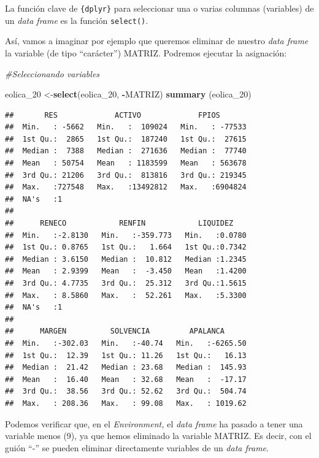 \documentclass[
]{book}
\newenvironment{Shaded}{\begin{snugshade}}{\end{snugshade}}
\newcommand{\CommentTok}[1]{\textcolor[rgb]{0.56,0.35,0.01}{\textit{#1}}}
\newcommand{\FunctionTok}[1]{\textcolor[rgb]{0.13,0.29,0.53}{\textbf{#1}}}
\newcommand{\NormalTok}[1]{#1}
\newcommand{\OtherTok}[1]{\textcolor[rgb]{0.56,0.35,0.01}{#1}}
\newcommand{\SpecialCharTok}[1]{\textcolor[rgb]{0.81,0.36,0.00}{\textbf{#1}}}
\begin{document}
La función clave de \texttt{\{dplyr\}} para seleccionar una o varias columnas (variables) de un \emph{data frame} es la función \texttt{select()}.

Así, vamos a imaginar por ejemplo que queremos eliminar de nuestro \emph{data frame} la variable (de tipo ``carácter'') MATRIZ. Podremos ejecutar la asignación:

\begin{Shaded}
\begin{Highlighting}[]
\CommentTok{\#Seleccionando variables}

\NormalTok{eolica\_20 }\OtherTok{\textless{}{-}}\FunctionTok{select}\NormalTok{(eolica\_20, }\SpecialCharTok{{-}}\NormalTok{MATRIZ)}
\FunctionTok{summary}\NormalTok{ (eolica\_20)}
\end{Highlighting}
\end{Shaded}

\begin{verbatim}
##       RES             ACTIVO             FPIOS        
##  Min.   : -5662   Min.   :  109024   Min.   : -77533  
##  1st Qu.:  2865   1st Qu.:  187240   1st Qu.:  27615  
##  Median :  7388   Median :  271636   Median :  77740  
##  Mean   : 50754   Mean   : 1183599   Mean   : 563678  
##  3rd Qu.: 21206   3rd Qu.:  813816   3rd Qu.: 219345  
##  Max.   :727548   Max.   :13492812   Max.   :6904824  
##  NA's   :1                                            
## 
##      RENECO            RENFIN            LIQUIDEZ     
##  Min.   :-2.8130   Min.   :-359.773   Min.   :0.0780  
##  1st Qu.: 0.8765   1st Qu.:   1.664   1st Qu.:0.7342  
##  Median : 3.6150   Median :  10.812   Median :1.2345  
##  Mean   : 2.9399   Mean   :  -3.450   Mean   :1.4200  
##  3rd Qu.: 4.7735   3rd Qu.:  25.312   3rd Qu.:1.5615  
##  Max.   : 8.5860   Max.   :  52.261   Max.   :5.3300  
##  NA's   :1                                            
## 
##      MARGEN          SOLVENCIA         APALANCA       
##  Min.   :-302.03   Min.   :-40.74   Min.   :-6265.50  
##  1st Qu.:  12.39   1st Qu.: 11.26   1st Qu.:   16.13  
##  Median :  21.42   Median : 23.68   Median :  145.93  
##  Mean   :  16.40   Mean   : 32.68   Mean   :  -17.17  
##  3rd Qu.:  38.56   3rd Qu.: 52.62   3rd Qu.:  504.74  
##  Max.   : 208.36   Max.   : 99.08   Max.   : 1019.62
\end{verbatim}

Podemos verificar que, en el \emph{Environment,} el \emph{data frame} ha pasado a tener una variable menos (9), ya que hemos eliminado la variable MATRIZ. Es decir, con el guión ``-'' se pueden eliminar directamente variables de un \emph{data frame}.
\end{document}
